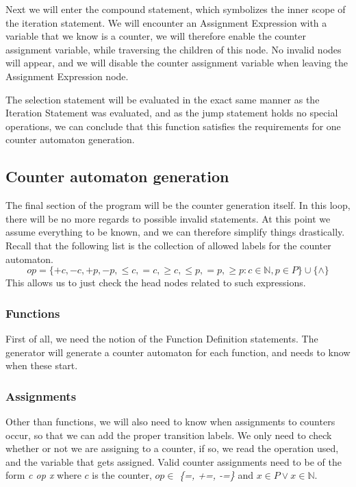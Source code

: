\documentclass[12pt]{article}
\begin{document}
Next we will enter the compound statement, which symbolizes the inner scope of the iteration statement. We will encounter an Assignment Expression with a variable that we know is a counter, we will therefore enable the counter assignment variable, while traversing the children of this node. No invalid nodes will appear, and we will disable the counter assignment variable when leaving the Assignment Expression node. 

The selection statement will be evaluated in the exact same manner as the Iteration Statement was evaluated, and as the jump statement holds no special operations, we can conclude that this function satisfies the requirements for one counter automaton generation.

\subsection{Counter automaton generation}
\label{sec:generation}
The final section of the program will be the counter generation itself. In this loop, there will be no more regards to possible invalid statements. At this point we assume everything to be known, and we can therefore simplify things drastically. Recall that the following list is the collection of allowed labels for the counter automaton.
\[
op = \{+c, -c, +p, -p, \leq c, =c, \geq c, \leq p, =p, \geq p: c \in \mathbb{N}, p \in P\} \cup \{\wedge\}
\]
This allows us to just check the head nodes related to such expressions.

\subsubsection{Functions}
First of all, we need the notion of the Function Definition statements. The generator will generate a counter automaton for each function, and needs to know when these start.

\subsubsection{Assignments}
Other than functions, we will also need to know when assignments to counters occur, so that we can add the proper transition labels. We only need to check whether or not we are assigning to a counter, if so, we read the operation used, and the variable that gets assigned. Valid counter assignments need to be of the form \textit{c op x} where $c$ is the counter, $op \in $ \textit{\{=, +=, -=\}} and $x \in P \lor x \in \mathbb{N}$. 
\end{document}
